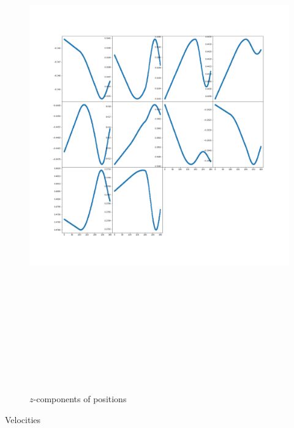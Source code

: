 \documentclass[12pt]{article}
\begin{document}
	\begin{figure}[H]
		\includegraphics[width=\linewidth, height=22cm]{subpsz3.png} \caption{$z$-components of positions} \label{subpsz3}
	\end{figure}
	Velocities
\end{document}
